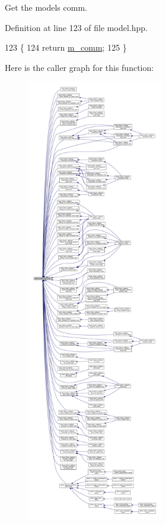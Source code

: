 Get the model\textquotesingle{}s comm. 

Definition at line 123 of file model.\+hpp.


\begin{DoxyCode}
123                                       \{
124     \textcolor{keywordflow}{return} \hyperlink{classlbann_1_1model_a0eabaf2b2f829fd5db3dfd26df420df0}{m\_comm};
125   \}
\end{DoxyCode}
Here is the caller graph for this function\+:\nopagebreak
\begin{figure}[H]
\begin{center}
\leavevmode
\includegraphics[height=550pt]{classlbann_1_1model_a9e1cfe449d2f4858a32994f6be0042fb_icgraph}
\end{center}
\end{figure}
\mbox{\label{classlbann_1_1model_a1cf70e098524cc5013bce56edd96dfe7}} 
